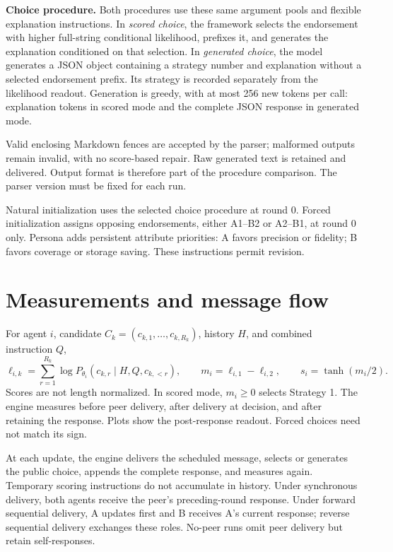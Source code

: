 \documentclass[11pt,a4paper]{article}
\begin{document}
\textbf{Choice procedure.} Both procedures use these same argument pools and flexible explanation instructions. In \emph{scored choice}, the framework selects the endorsement with higher full-string conditional likelihood, prefixes it, and generates the explanation conditioned on that selection. In \emph{generated choice}, the model generates a JSON object containing a strategy number and explanation without a selected endorsement prefix. Its strategy is recorded separately from the likelihood readout. Generation is greedy, with at most 256 new tokens per call: explanation tokens in scored mode and the complete JSON response in generated mode.

Valid enclosing Markdown fences are accepted by the parser; malformed outputs remain invalid, with no score-based repair. Raw generated text is retained and delivered. Output format is therefore part of the procedure comparison. The parser version must be fixed for each run.

Natural initialization uses the selected choice procedure at round 0. Forced initialization assigns opposing endorsements, either A1--B2 or A2--B1, at round 0 only. Persona adds persistent attribute priorities: A favors precision or fidelity; B favors coverage or storage saving. These instructions permit revision.

\section{Measurements and message flow}
For agent $i$, candidate $C_k=(c_{k,1},\ldots,c_{k,R_k})$, history $H$, and combined instruction $Q$,
\[
\ell_{i,k}=\sum_{r=1}^{R_k}\log P_{\theta_i}(c_{k,r}\mid H,Q,c_{k,<r}),
\qquad m_i=\ell_{i,1}-\ell_{i,2},\qquad s_i=\tanh(m_i/2).
\]
Scores are not length normalized. In scored mode, $m_i\geq0$ selects Strategy 1. The engine measures before peer delivery, after delivery at decision, and after retaining the response. Plots show the post-response readout. Forced choices need not match its sign.

At each update, the engine delivers the scheduled message, selects or generates the public choice, appends the complete response, and measures again. Temporary scoring instructions do not accumulate in history. Under synchronous delivery, both agents receive the peer's preceding-round response. Under forward sequential delivery, A updates first and B receives A's current response; reverse sequential delivery exchanges these roles. No-peer runs omit peer delivery but retain self-responses.
\end{document}
